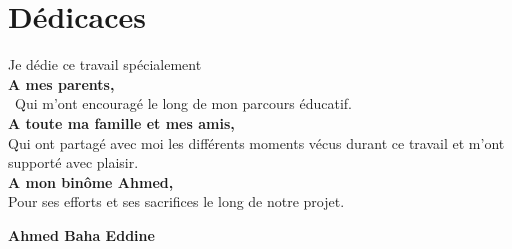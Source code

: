 



\chapter*{\centering Dédicaces }

\begin{center}
	
	\begin{minipage}[c]{1\columnwidth}
		
		{\large 
			\vskip1cm
			
			\centering
			Je dédie ce travail spécialement \\\vskip0.5cm\textbf{A mes parents,}\\\ Qui m'ont encouragé le long de mon parcours éducatif.\\ \vskip0.5cm
			\textbf{A toute ma famille et mes amis,}\\Qui ont partagé avec moi les différents moments vécus durant ce travail et m'ont supporté avec plaisir.\\ \vskip0.5cm
			\textbf{A mon binôme Ahmed,}\\
			Pour ses efforts et ses sacrifices le long de notre projet.
			
		}
		
		
	\end{minipage}
	
\end{center}

\vskip1.5cm
\begin{flushright}\LARGE
	\bf{Ahmed Baha Eddine}
\end{flushright}
